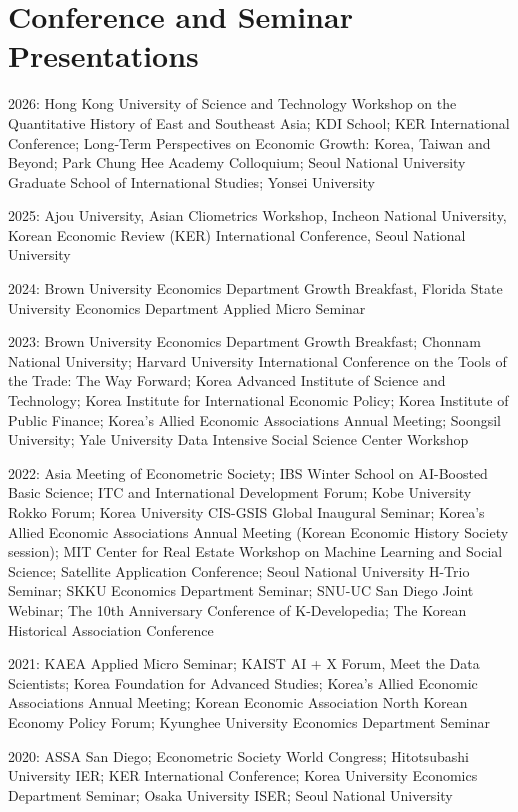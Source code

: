 \documentclass[a4paper,12pt]{article}
\renewenvironment{itemize}{
  \begin{list}{}{
    \setlength{\leftmargin}{1.5em}
  }
}{
  \end{list}
}
\begin{document}
\section*{Conference and Seminar Presentations}
\begin{itemize}
\item 2026: Hong Kong University of Science and Technology Workshop on the Quantitative History of East and Southeast Asia; KDI School; KER International Conference; Long-Term Perspectives on Economic Growth: Korea, Taiwan and Beyond; Park Chung Hee Academy Colloquium; Seoul National University Graduate School of International Studies; Yonsei University
\item 2025: Ajou University, Asian Cliometrics Workshop, Incheon National University, Korean Economic Review (KER) International Conference, Seoul National University
\item 2024: Brown University Economics Department Growth Breakfast, Florida State University Economics Department Applied Micro Seminar
\item 2023: Brown University Economics Department Growth Breakfast; Chonnam National University; Harvard University International Conference on the Tools of the Trade: The Way Forward; Korea Advanced Institute of Science and Technology; Korea Institute for International Economic Policy; Korea Institute of Public Finance; Korea’s Allied Economic Associations Annual Meeting; Soongsil University; Yale University Data Intensive Social Science Center Workshop
\item 2022: Asia Meeting of Econometric Society; IBS Winter School on AI-Boosted Basic Science; ITC and International Development Forum; Kobe University Rokko Forum; Korea University CIS-GSIS Global Inaugural Seminar; Korea's Allied Economic Associations Annual Meeting (Korean Economic History Society session); MIT Center for Real Estate Workshop on Machine Learning and Social Science; Satellite Application Conference; Seoul National University H-Trio Seminar; SKKU Economics Department Seminar; SNU-UC San Diego Joint Webinar; The 10th Anniversary Conference of K-Developedia; The Korean Historical Association Conference
\item 2021: KAEA Applied Micro Seminar; KAIST AI + X Forum, Meet the Data Scientists; Korea Foundation for Advanced Studies; Korea's Allied Economic Associations Annual Meeting; Korean Economic Association North Korean Economy Policy Forum; Kyunghee University Economics Department Seminar
\item 2020: ASSA San Diego; Econometric Society  World Congress; Hitotsubashi University IER; KER International Conference; Korea University Economics Department Seminar; Osaka University ISER; Seoul National University

\end{itemize}
\end{document}
